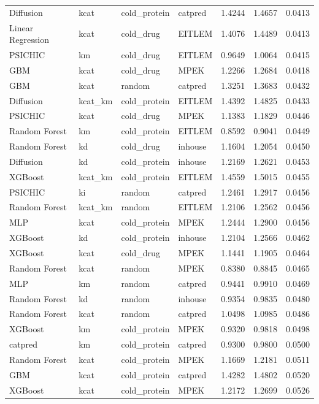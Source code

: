 \begin{tabular}{llllrrr}
Diffusion & kcat & cold_protein & catpred & 1.4244 & 1.4657 & 0.0413 \\
Linear Regression & kcat & cold_drug & EITLEM & 1.4076 & 1.4489 & 0.0413 \\
PSICHIC & km & cold_drug & EITLEM & 0.9649 & 1.0064 & 0.0415 \\
GBM & kcat & cold_drug & MPEK & 1.2266 & 1.2684 & 0.0418 \\
GBM & kcat & random & catpred & 1.3251 & 1.3683 & 0.0432 \\
Diffusion & kcat_km & cold_protein & EITLEM & 1.4392 & 1.4825 & 0.0433 \\
PSICHIC & kcat & cold_drug & MPEK & 1.1383 & 1.1829 & 0.0446 \\
Random Forest & km & cold_protein & EITLEM & 0.8592 & 0.9041 & 0.0449 \\
Random Forest & kd & cold_drug & inhouse & 1.1604 & 1.2054 & 0.0450 \\
Diffusion & kd & cold_protein & inhouse & 1.2169 & 1.2621 & 0.0453 \\
XGBoost & kcat_km & cold_protein & EITLEM & 1.4559 & 1.5015 & 0.0455 \\
PSICHIC & ki & random & catpred & 1.2461 & 1.2917 & 0.0456 \\
Random Forest & kcat_km & random & EITLEM & 1.2106 & 1.2562 & 0.0456 \\
MLP & kcat & cold_protein & MPEK & 1.2444 & 1.2900 & 0.0456 \\
XGBoost & kd & cold_protein & inhouse & 1.2104 & 1.2566 & 0.0462 \\
XGBoost & kcat & cold_drug & MPEK & 1.1441 & 1.1905 & 0.0464 \\
Random Forest & kcat & random & MPEK & 0.8380 & 0.8845 & 0.0465 \\
MLP & km & random & catpred & 0.9441 & 0.9910 & 0.0469 \\
Random Forest & kd & random & inhouse & 0.9354 & 0.9835 & 0.0480 \\
Random Forest & kcat & random & catpred & 1.0498 & 1.0985 & 0.0486 \\
XGBoost & km & cold_protein & MPEK & 0.9320 & 0.9818 & 0.0498 \\
catpred & km & cold_protein & catpred & 0.9300 & 0.9800 & 0.0500 \\
Random Forest & kcat & cold_protein & MPEK & 1.1669 & 1.2181 & 0.0511 \\
GBM & kcat & cold_protein & catpred & 1.4282 & 1.4802 & 0.0520 \\
XGBoost & kcat & cold_protein & MPEK & 1.2172 & 1.2699 & 0.0526 \\

\end{tabular}

